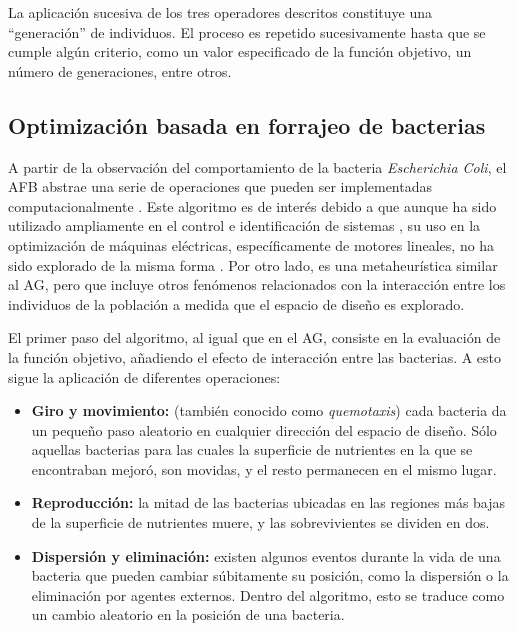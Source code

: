 La aplicación sucesiva de los tres operadores descritos constituye una ``generación'' de individuos. El proceso es repetido sucesivamente hasta que se cumple algún criterio, como un valor especificado de la función objetivo, un número de generaciones, entre otros.

\subsection{Optimización basada en forrajeo de bacterias}

A partir de la observación del comportamiento de la bacteria \textit{Escherichia Coli}, el AFB abstrae una serie de operaciones que pueden ser implementadas computacionalmente \cite{passino2002}. Este algoritmo es de interés debido a que aunque ha sido utilizado ampliamente en el control e identificación de sistemas \cite{precup2014,precup2014b}, su uso en la optimización de máquinas eléctricas, específicamente de motores lineales, no ha sido explorado de la misma forma \cite{duan2013,sakthivel2010}. Por otro lado, es una metaheurística similar al AG, pero que incluye otros fenómenos relacionados con la interacción entre los individuos de la población a medida que el espacio de diseño es explorado.

El primer paso del algoritmo, al igual que en el AG, consiste en la evaluación de la función objetivo, añadiendo el efecto de interacción entre las bacterias. A esto sigue la aplicación de diferentes operaciones:

\begin{itemize}
\item \textbf{Giro y movimiento:} (también conocido como \textit{quemotaxis}) cada bacteria da un pequeño paso aleatorio en cualquier dirección del espacio de diseño. Sólo aquellas bacterias para las cuales la superficie de nutrientes en la que se encontraban mejoró, son movidas, y el resto permanecen en el mismo lugar.
\item \textbf{Reproducción:} la mitad de las bacterias ubicadas en las regiones más bajas de la superficie de nutrientes muere, y las sobrevivientes se dividen en dos.
\item \textbf{Dispersión y eliminación:} existen algunos eventos durante la vida de una bacteria que pueden cambiar súbitamente su posición, como la dispersión o la eliminación por agentes externos. Dentro del algoritmo, esto se traduce como un cambio aleatorio en la posición de una bacteria.
\end{itemize}

